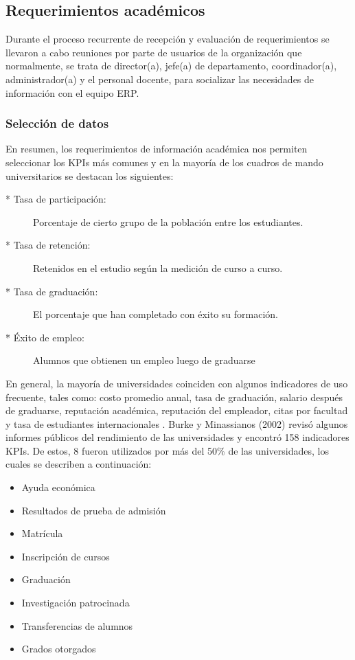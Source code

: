 \documentclass[12pt,jou]{apa7}
\begin{document}
\subsection{Requerimientos académicos}

Durante el proceso recurrente de recepción y evaluación de requerimientos se llevaron a cabo reuniones por parte de usuarios de la organización que normalmente, se trata de director(a), jefe(a) de departamento, coordinador(a), administrador(a) y el personal docente, para socializar las necesidades de información con el equipo ERP.

\subsubsection{Selección de datos}
En resumen, los requerimientos de información académica nos permiten seleccionar los KPIs más comunes y en la mayoría de los cuadros de mando universitarios se destacan los siguientes:
\begin{description}
	\item[* Tasa de participación:]
	Porcentaje de cierto grupo de la población entre los estudiantes.
	\item[* Tasa de retención:]  
	Retenidos en el estudio según la medición de curso a curso.
	\item[* Tasa de graduación:]
	El porcentaje que han completado con éxito su formación.
	\item[* Éxito de empleo:]
	Alumnos que obtienen un empleo luego de graduarse
\end{description}

En general, la mayoría de universidades coinciden con algunos indicadores de uso frecuente, tales como: costo promedio anual, tasa de graduación, salario después de graduarse, reputación académica, reputación del empleador, citas por facultad y tasa de estudiantes internacionales \cite{bscd}. Burke y  Minassianos (2002) revisó algunos informes públicos del rendimiento de las universidades y encontró 158 indicadores KPIs. De estos, 8 fueron utilizados por más del 50\% de las universidades, los cuales se describen a continuación:

\begin{itemize}
\item Ayuda económica
\item Resultados de prueba de admisión
\item Matrícula
\item Inscripción de cursos
\item Graduación
\item Investigación patrocinada
\item Transferencias de alumnos
\item Grados otorgados
\end{itemize}
\end{document}
